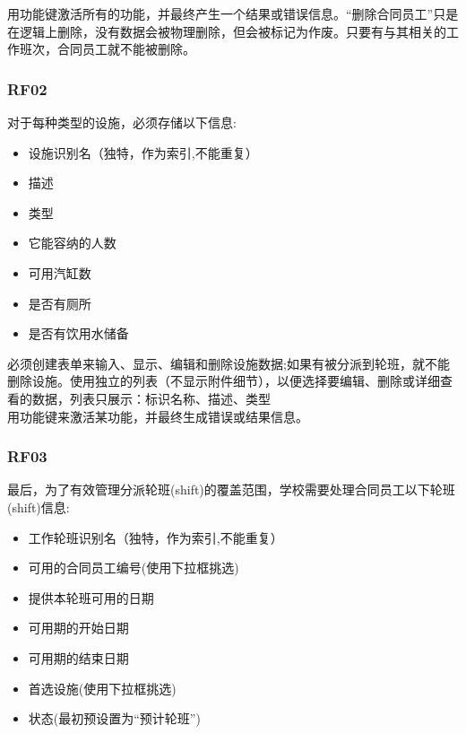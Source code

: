 用功能键激活所有的功能，并最终产生一个结果或错误信息。“删除合同员工”只是在逻辑上删除，没有数据会被物理删除，但会被标记为作废。只要有与其相关的工作班次，合同员工就不能被删除。 \\

\hypertarget{ux63a5ux4e58ux5ba2}{%
\subsubsection{RF02}\label{ux63a5ux4e58ux5ba2}}


对于每种类型的设施，必须存储以下信息: \\

\begin{itemize}
\tightlist
\item
  设施识别名（独特，作为索引,不能重复）
\item
  描述
\item
  类型
\item
  它能容纳的人数
\item
  可用汽缸数
\item
  是否有厕所
\item
  是否有饮用水储备
\end{itemize}

必须创建表单来输入、显示、编辑和删除设施数据;如果有被分派到轮班，就不能删除设施。使用独立的列表（不显示附件细节），以便选择要编辑、删除或详细查看的数据，列表只展示：标识名称、描述、类型\\
用功能键来激活某功能，并最终生成错误或结果信息。 \\

\hypertarget{ux63a5ux4e58ux5ba2}{%
\subsubsection{RF03}\label{ux63a5ux4e58ux5ba2}}

最后，为了有效管理分派轮班(shift)的覆盖范围，学校需要处理合同员工以下轮班(shift)信息: \\

\begin{itemize}
\tightlist
\item
  工作轮班识别名（独特，作为索引,不能重复）
\item
  可用的合同员工编号(使用下拉框挑选)
\item
  提供本轮班可用的日期
\item
  可用期的开始日期
\item
  可用期的结束日期
\item
  首选设施(使用下拉框挑选)
\item
  状态(最初预设置为“预计轮班”)
\end{itemize}

